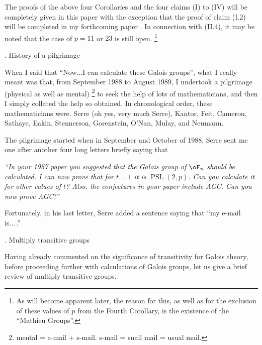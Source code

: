 The proofs of the above four Corollaries and the four 
claims (I) to (IV)
will be completely given in this paper with the exception 
that the
proof of claim (I.2) will be completed in my forthcoming 
paper \cite{A7}.
In connection with (II.4), it may be noted that the case 
of $p=11$ or $23$
is still open.
\footnote{As will become apparent later, the reason for 
this, as well as
for the exclusion of these values of $p$ from the Fourth 
Corollary, 
is the existence of the ``Mathieu Groups''.}

. History of a pilgrimage\endheading

When I said that  ``Now...I can calculate these Galois 
groups'', what I really
meant was that, from September 1988 to August 1989, I 
undertook a
pilgrimage (physical as well as mental)
\footnote{mental = e-mail + s-mail. s-mail = snail mail = 
usual mail.}
to seek the help of lots of mathematicians, and then I 
simply collated the
help so obtained. In chronological order, these 
mathematicians were.
Serre (oh yes, very much Serre), Kantor, Feit, Cameron, 
Sathaye, Eakin, 
Stennerson, Gorenstein, O'Nan, Mulay, and Neumann.

The pilgrimage started when in September and October of 
1988, Serre
sent me one after another four long letters briefly saying 
that

{\it {\rm``}In your {\rm1957} paper you suggested that the 
Galois group of
$\oF_n$ should be calculated. I can now prove that for 
$t=1$ it is
$\operatorname{PSL}(2,p)$. Can you calculate it for other 
values of $t${\rm?} 
Also, the conjectures in your paper include AGC. Can you 
now prove
AGC\/}{\rm?''}

Fortunately, in his last letter, Serre added a sentence 
saying that
``my e-mail is...\,.'' 

. Multiply transitive groups\endheading

Having already commented on the significance of 
transitivity for Galois theory,
before proceeding further with calculations of Galois 
groups, let us give a 
brief review of multiply transitive groups.

